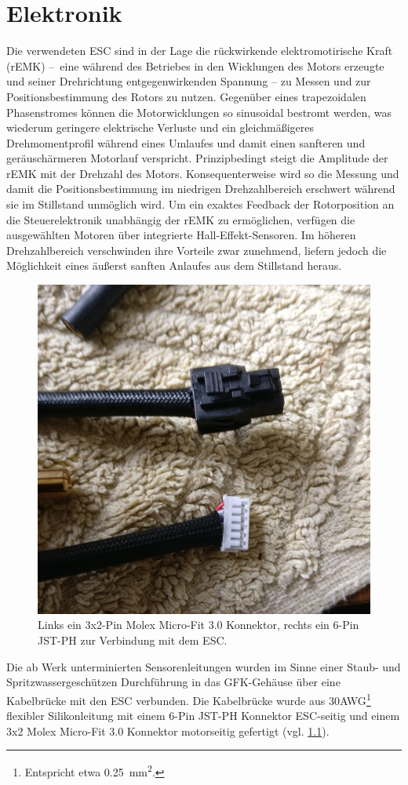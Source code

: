 \chapter{Elektronik}
	Die verwendeten ESC sind in der Lage die rückwirkende elektromotirische Kraft (rEMK) --~eine während des Betriebes in den Wicklungen des Motors erzeugte und seiner Drehrichtung entgegenwirkenden Spannung -- zu Messen und zur Positionsbestimmung des Rotors zu nutzen.
	Gegenüber eines trapezoidalen Phasenstromes können die Motorwicklungen so sinusoidal bestromt werden, was wiederum geringere elektrische Verluste und ein gleichmäßigeres Drehmomentprofil während eines Umlaufes und damit einen sanfteren und geräuschärmeren Motorlauf verspricht.
	Prinzipbedingt steigt die Amplitude der rEMK mit der Drehzahl des Motors.
	Konsequenterweise wird so die Messung und damit die Positionsbestimmung im niedrigen Drehzahlbereich erschwert während sie im Stillstand unmöglich wird.
	Um ein exaktes Feedback der Rotorposition an die Steuerelektronik unabhängig der rEMK zu ermöglichen, verfügen die ausgewählten Motoren über integrierte Hall-Effekt-Sensoren.
	Im höheren Drehzahlbereich verschwinden ihre Vorteile zwar zunehmend, liefern jedoch die Möglichkeit eines äußerst sanften Anlaufes aus dem Stillstand heraus.\par\medskip
	\begin{figure}
		\centering
		\includegraphics[angle=90, width=.4\textwidth]{Footage/Pictures/Hall sensor connector.jpg}
		\caption[Hall-Sensoren Konnektoren]{Links ein 3x2-Pin Molex Micro-Fit 3.0 Konnektor, rechts ein 6-Pin JST-PH zur Verbindung mit dem ESC.}
		\label{fig:hall sensor connectors}
	\end{figure}
	Die ab Werk unterminierten Sensorenleitungen wurden im Sinne einer Staub- und Spritzwassergeschützen Durchführung in das GFK-Gehäuse über eine Kabelbrücke mit den ESC verbunden.
	Die Kabelbrücke wurde aus 30AWG\footnote{Entspricht etwa \qty{0,25}{\milli\metre\squared}.} flexibler Silikonleitung mit einem 6-Pin JST-PH Konnektor ESC-seitig und einem 3x2 Molex Micro-Fit 3.0 Konnektor motorseitig gefertigt (vgl. \cref{fig:hall sensor connectors}).
